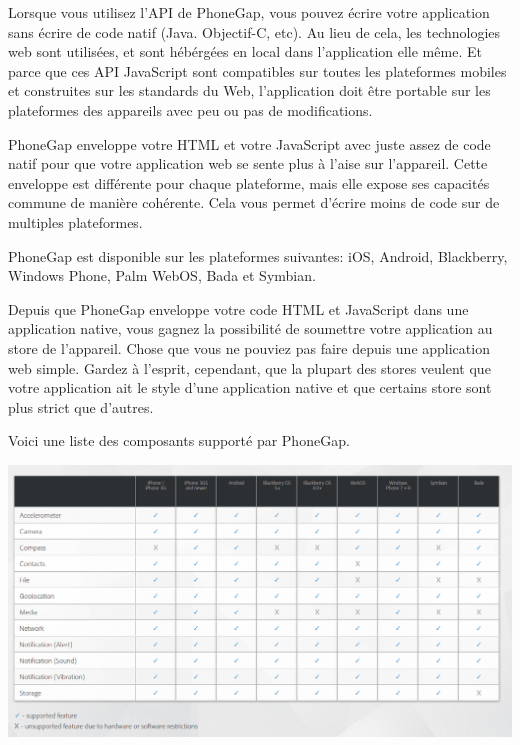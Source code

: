 Lorsque vous utilisez l’API de PhoneGap, vous pouvez écrire votre application sans écrire de code natif (Java. Objectif-C, etc). Au lieu de cela, les technologies web sont utilisées, et sont hébérgées en local dans l’application elle même. Et parce que ces API JavaScript sont compatibles sur toutes les plateformes mobiles et construites sur les standards du Web, l’application doit être portable sur les plateformes des appareils avec peu ou pas de modifications.

PhoneGap enveloppe votre HTML et votre JavaScript avec juste assez de code natif pour que votre application web se sente plus à l’aise sur l’appareil. Cette enveloppe est différente pour chaque plateforme, mais elle expose ses capacités commune de manière cohérente. Cela vous permet d’écrire moins de code sur de multiples plateformes.

PhoneGap est disponible sur les plateformes suivantes: iOS, Android, Blackberry, Windows Phone, Palm WebOS, Bada et Symbian.

Depuis que PhoneGap enveloppe votre code HTML et JavaScript dans une application native, vous gagnez la possibilité de soumettre votre application au store de l’appareil. Chose que vous ne pouviez pas faire depuis une application web simple. Gardez à l’esprit, cependant, que la plupart des stores veulent que votre application ait le style d’une application native et que certains store sont plus strict que d’autres.

Voici une liste des composants supporté par PhoneGap.

\begin{center}
\includegraphics[width=14cm]{img/phonegapFeatures.png}
\label{Plateforme Wakanda}
\end{center}